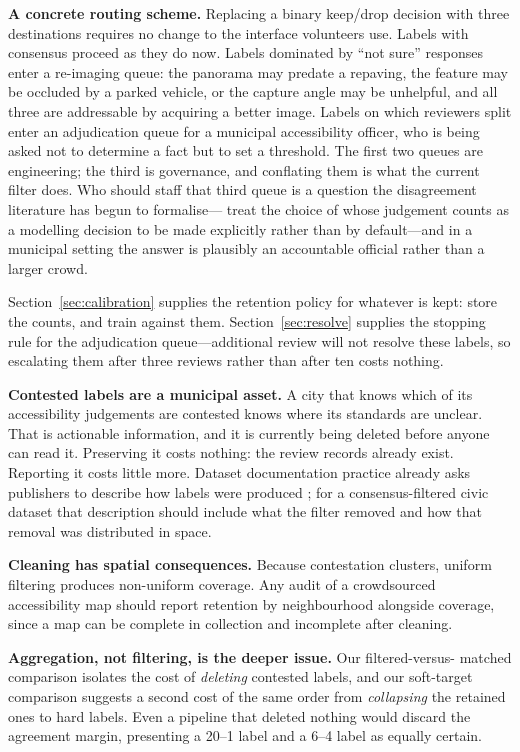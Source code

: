 \documentclass[sigconf]{acmart}
\begin{document}
\textbf{A concrete routing scheme.} Replacing a binary keep/drop decision with
three destinations requires no change to the interface volunteers use. Labels
with consensus proceed as they do now. Labels dominated by ``not sure''
responses enter a re-imaging queue: the panorama may predate a repaving, the
feature may be occluded by a parked vehicle, or the capture angle may be
unhelpful, and all three are addressable by acquiring a better image. Labels on
which reviewers split enter an adjudication queue for a municipal accessibility
officer, who is being asked not to determine a fact but to set a threshold. The
first two queues are engineering; the third is governance, and conflating them
is what the current filter does. Who should staff that third queue is a question
the disagreement literature has begun to formalise---\citet{gordon2022jury} treat
the choice of whose judgement counts as a modelling decision to be made
explicitly rather than by default---and in a municipal setting the answer is
plausibly an accountable official rather than a larger crowd.

Section~\ref{sec:calibration} supplies the retention policy for whatever is
kept: store the counts, and train against them. Section~\ref{sec:resolve}
supplies the stopping rule for the adjudication queue---additional review will
not resolve these labels, so escalating them after three reviews rather than
after ten costs nothing.

\textbf{Contested labels are a municipal asset.} A city that knows which of its
accessibility judgements are contested knows where its standards are unclear.
That is actionable information, and it is currently being deleted before anyone
can read it. Preserving it costs nothing: the review records already exist.
Reporting it costs little more. Dataset documentation practice already asks
publishers to describe how labels were produced \cite{gebru2021datasheets}; for
a consensus-filtered civic dataset that description should include what the
filter removed and how that removal was distributed in space.

\textbf{Cleaning has spatial consequences.} Because contestation clusters,
uniform filtering produces non-uniform coverage. Any audit of a crowdsourced
accessibility map should report retention by neighbourhood alongside coverage,
since a map can be complete in collection and incomplete after cleaning.

\textbf{Aggregation, not filtering, is the deeper issue.} Our filtered-versus-%
matched comparison isolates the cost of \emph{deleting} contested labels, and
our soft-target comparison suggests a second cost of the same order from
\emph{collapsing} the retained ones to hard labels. Even a pipeline that deleted
nothing would discard the agreement margin, presenting a 20--1 label and a 6--4
label as equally certain.
\end{document}
